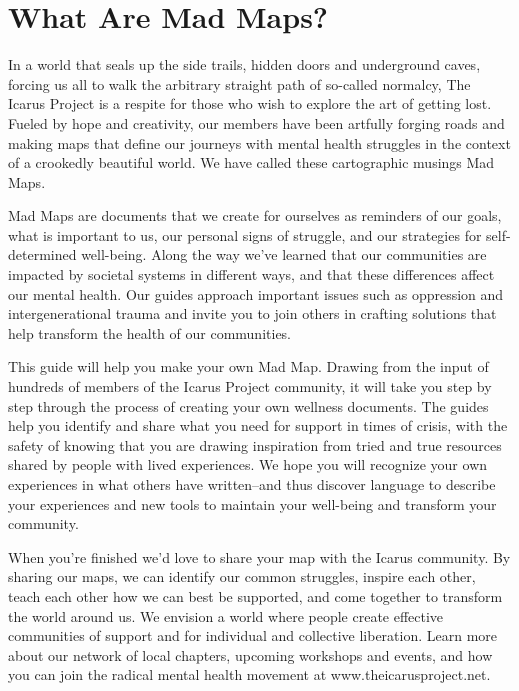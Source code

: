 \chapter*{What Are Mad Maps?}

In  a  world  that  seals  up  the  side  trails,  hidden  doors  and  underground  caves, forcing  us  all  to  walk  the  arbitrary  straight  path  of  so-called  normalcy,  The Icarus Project is a respite for those who wish to explore the art of getting lost. Fueled  by  hope  and  creativity,  our  members  have  been  artfully  forging  roads and making maps that define our journeys with mental health struggles in the context of a crookedly beautiful world. We have called these cartographic musings Mad Maps.

Mad  Maps  are  documents  that  we  create  for  ourselves  as  reminders  of  our goals, what is important to us, our personal signs of struggle, and our strategies for self-determined well-being. Along  the  way  we’ve  learned  that  our  communities  are  impacted  by  societal systems in different ways, and that these differences affect our mental health. Our  guides  approach  important  issues  such  as  oppression  and  intergenerational trauma and invite you to join others in crafting solutions that help transform the health of our communities.

This  guide  will  help  you  make  your  own  Mad  Map.  Drawing  from  the  input  of hundreds  of  members  of  the  Icarus  Project  community,  it  will  take  you  step by  step  through  the  process  of  creating  your  own  wellness  documents.  The guides help you identify and share what you need for support in times of crisis, with the safety of knowing that you are drawing inspiration from tried and true resources shared by people with lived experiences. We hope you will recognize your own experiences in what others have written--and thus discover language to  describe  your  experiences  and  new  tools  to  maintain  your  well-being  and transform your community.

When  you’re  finished  we’d  love  to  share  your  map  with  the  Icarus  community. By sharing our maps, we can identify our common struggles, inspire each other, teach each other how we can best be supported, and come together to transform the world around us. We envision a world where people create effective  communities  of  support  and  for  individual  and  collective  liberation.  Learn more  about  our  network  of  local  chapters,  upcoming  workshops  and  events, and  how  you  can  join  the  radical  mental  health  movement  at  www.theicarusproject.net.


